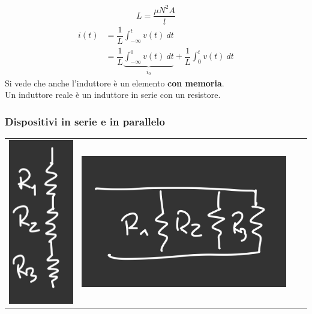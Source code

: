 \documentclass{article}
\begin{document}
\[
   L = \dfrac{\mu  N^2  A}{l} 
\]
\begin{align*}
    i(t) &= \dfrac{1}{L} \int_{- \infty}^{t} v(t) \ dt \\
    &= \dfrac{1}{L} \underbrace{\int_{- \infty}^{0} v(t) \ dt}_{i_0} + \dfrac{1}{L} \int_{0}^{t} v(t) \ dt
\end{align*}
Si vede che anche l'induttore è un elemento \textbf{con memoria}.\\
Un induttore reale è un induttore in serie con un resistore.

\subsubsection{Dispositivi in serie e in parallelo}
\begin{center}
    \begin{tabular}{c c c c}
        \includegraphics[scale=0.37]{Image/Resistori in serie.png} 
        &
         \includegraphics[scale=0.37]{Image/Resistori in parallelo.png} 

\end{tabular}
\end{center}
\end{document}
